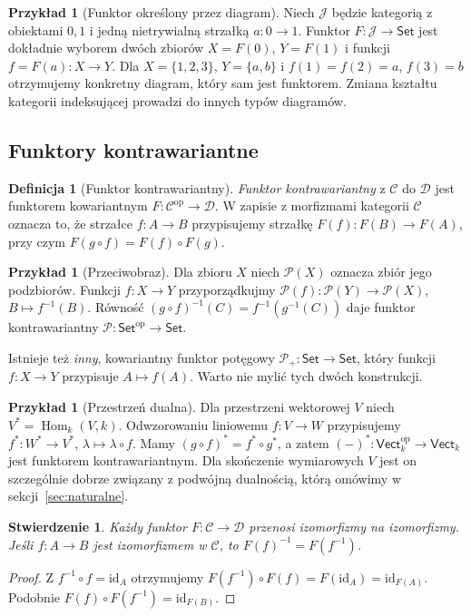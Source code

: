 \documentclass[11pt,a4paper]{article}
\numberwithin{equation}{section}
\theoremstyle{plain}
\newtheorem{stwierdzenie}[twierdzenie]{Stwierdzenie}
\theoremstyle{definition}
\newtheorem{definicja}[twierdzenie]{Definicja}
\newtheorem{przyklad}[twierdzenie]{Przykład}
\theoremstyle{remark}
\newcommand{\cat}[1]{\mathsf{#1}}
\newcommand{\Set}{\cat{Set}}
\newcommand{\Vect}{\cat{Vect}}
\newcommand{\id}{\mathrm{id}}
\newcommand{\Hom}{\operatorname{Hom}}
\newcommand{\op}{\mathrm{op}}
\begin{document}
\begin{przyklad}[Funktor określony przez diagram]
Niech $\mathcal J$ będzie kategorią z obiektami $0,1$ i jedną nietrywialną strzałką $a:0\to1$. Funktor $F:\mathcal J\to\Set$ jest dokładnie wyborem dwóch zbiorów $X=F(0)$, $Y=F(1)$ i funkcji $f=F(a):X\to Y$. Dla $X=\{1,2,3\}$, $Y=\{a,b\}$ i $f(1)=f(2)=a$, $f(3)=b$ otrzymujemy konkretny diagram, który sam jest funktorem. Zmiana kształtu kategorii indeksującej prowadzi do innych typów diagramów.
\end{przyklad}


\subsection{Funktory kontrawariantne}

\begin{definicja}[Funktor kontrawariantny]
\emph{Funktor kontrawariantny} z $\mathcal C$ do $\mathcal D$ jest funktorem kowariantnym $F:\mathcal C^{\op}\to\mathcal D$. W zapisie z morfizmami kategorii $\mathcal C$ oznacza to, że strzałce $f:A\to B$ przypisujemy strzałkę $F(f):F(B)\to F(A)$, przy czym $F(g\circ f)=F(f)\circ F(g)$.
\end{definicja}

\begin{przyklad}[Przeciwobraz]
Dla zbioru $X$ niech $\mathcal P(X)$ oznacza zbiór jego podzbiorów. Funkcji $f:X\to Y$ przyporządkujmy $\mathcal P(f):\mathcal P(Y)\to\mathcal P(X)$, $B\mapsto f^{-1}(B)$. Równość $(g\circ f)^{-1}(C)=f^{-1}(g^{-1}(C))$ daje funktor kontrawariantny $\mathcal P:\Set^{\op}\to\Set$.

Istnieje też \emph{inny}, kowariantny funktor potęgowy $\mathcal P_+:\Set\to\Set$, który funkcji $f:X\to Y$ przypisuje $A\mapsto f(A)$. Warto nie mylić tych dwóch konstrukcji.
\end{przyklad}

\begin{przyklad}[Przestrzeń dualna]\label{przyklad:dualny}
Dla przestrzeni wektorowej $V$ niech $V^*=\Hom_k(V,k)$. Odwzorowaniu liniowemu $f:V\to W$ przypisujemy $f^*:W^*\to V^*$, $\lambda\mapsto\lambda\circ f$. Mamy $(g\circ f)^*=f^*\circ g^*$, a zatem $(-)^*:\Vect_k^{\op}\to\Vect_k$ jest funktorem kontrawariantnym. Dla skończenie wymiarowych $V$ jest on szczególnie dobrze związany z podwójną dualnością, którą omówimy w sekcji~\ref{sec:naturalne}.
\end{przyklad}

\begin{stwierdzenie}\label{tw:funktory-iso}
Każdy funktor $F:\mathcal C\to\mathcal D$ przenosi izomorfizmy na izomorfizmy. Jeśli $f:A\to B$ jest izomorfizmem w $\mathcal C$, to $F(f)^{-1}=F(f^{-1})$.
\end{stwierdzenie}
\begin{proof}
Z $f^{-1}\circ f=\id_A$ otrzymujemy $F(f^{-1})\circ F(f)=F(\id_A)=\id_{F(A)}$. Podobnie $F(f)\circ F(f^{-1})=\id_{F(B)}$.
\end{proof}
\end{document}
